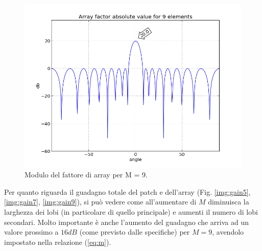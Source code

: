 \begin{figure}
\centering
\caption{Modulo del fattore di array per M = 9.}
\label{img:module9}
\includegraphics[scale=0.5]{Immagini/module9}
\end{figure}

Per quanto riguarda il guadagno totale del patch e dell'array (Fig. \ref{img:gain5}, \ref{img:gain7}, \ref{img:gain9}), si può vedere come all'aumentare di $M$ diminuisca la larghezza dei lobi (in particolare di quello principale) e aumenti il numero di lobi secondari. Molto importante è anche l'aumento del guadagno che arriva ad un valore prossimo a $16 dB$ (come previsto dalle specifiche) per $M = 9$, avendolo impostato nella relazione (\ref{eq:m}). \\ 

